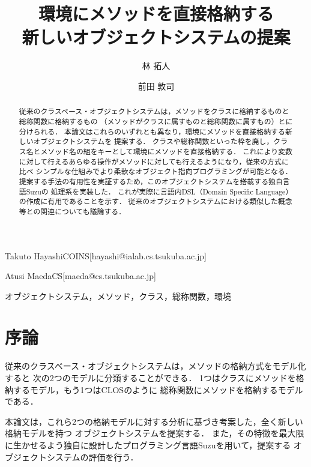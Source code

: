 \documentclass{ipsjprosym}
\begin{document}
\title{環境にメソッドを直接格納する \\ 新しいオブジェクトシステムの提案}


\author{林 拓人}{Takuto Hayashi}{COINS}[hayashi@ialab.cs.tsukuba.ac.jp]
\author{前田 敦司}{Atusi Maeda}{CS}[maeda@cs.tsukuba.ac.jp]

\begin{abstract}
従来のクラスベース・オブジェクトシステムは，メソッドをクラスに格納するものと総称関数に格納するもの
（メソッドがクラスに属すものと総称関数に属すもの）とに分けられる．
本論文はこれらのいずれとも異なり，環境にメソッドを直接格納する新しいオブジェクトシステムを
提案する．
クラスや総称関数といった枠を廃し，クラス名とメソッド名の組をキーとして環境にメソッドを直接格納する．
これにより変数に対して行えるあらゆる操作がメソッドに対しても行えるようになり，従来の方式に比べ
シンプルな仕組みでより柔軟なオブジェクト指向プログラミングが可能となる．
提案する手法の有用性を実証するため，このオブジェクトシステムを搭載する独自言語Suzuの
処理系を実装した．
これが実際に言語内DSL（Domain Specific Language）の作成に有用であることを示す．
従来のオブジェクトシステムにおける類似した概念等との関連についても議論する．
\end{abstract}

\begin{jkeyword}
オブジェクトシステム，メソッド，クラス，総称関数，環境
\end{jkeyword}

\maketitle

\section{序論}

従来のクラスベース・オブジェクトシステムは，メソッドの格納方式をモデル化すると
次の2つのモデルに分類することができる．
1つはクラスにメソッドを格納するモデル，もう1つはCLOS\cite{Ida:2010}のように
総称関数にメソッドを格納するモデルである．

本論文は，これら2つの格納モデルに対する分析に基づき考案した，全く新しい格納モデルを持つ
オブジェクトシステムを提案する．
また，その特徴を最大限に生かせるよう独自に設計したプログラミング言語Suzuを用いて，提案する
オブジェクトシステムの評価を行う．
\end{document}
